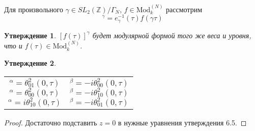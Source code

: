 \documentclass{article}
\newcommand{\ZZ}{\mathbb{Z}}
\theoremstyle{break}
\newtheorem{claim}{Утверждение}[section]
\newcommand{\ModkN}[2]{\text{Mod}_{#1}^{(#2)}}
\begin{document}
 Для произвольного $\gamma \in SL_2(\ZZ) / \Gamma_N$, $f \in \ModkN{k}{N}$ рассмотрим
 \begin{equation}
 	[f(\tau)]^\gamma = e_{\gamma}^{-1}(\tau) f(\gamma\tau)
 \end{equation}
 
\begin{claim}
	$[f(\tau)]^\gamma$ будет модулярной формой того же веса и уровня, что и 
	$f(\tau) \in \ModkN{k}{N}$.
\end{claim}


\begin{claim}
	\begin{tabularx}{\textwidth}{@{}X|X@{}}
		\begin{equation}[\theta_{00}^2(0, \tau)]^\alpha=\theta_{01}^2(0, \tau)\end{equation}
		\begin{equation}[\theta_{00}^2(0, \tau)]^\alpha=\theta_{00}^2(0, \tau)\end{equation}
		\begin{equation}[\theta_{00}^2(0, \tau)]^\alpha=i\theta_{10}^2(0, \tau)\end{equation}
		&
		\begin{equation}[\theta_{00}^2(0, \tau)]^\beta=-i\theta_{00}^2(0, \tau)\end{equation}
		\begin{equation}[\theta_{00}^2(0, \tau)]^\beta=-i\theta_{10}^2(0, \tau)\end{equation}
		\begin{equation}[\theta_{00}^2(0, \tau)]^\beta=-i\theta_{01}^2(0, \tau)\end{equation}
	\end{tabularx}
\end{claim}
\begin{proof}
	Достаточно подставить $z=0$ в нужные уравнения утверждения 6.5.
\end{proof}
\end{document}
